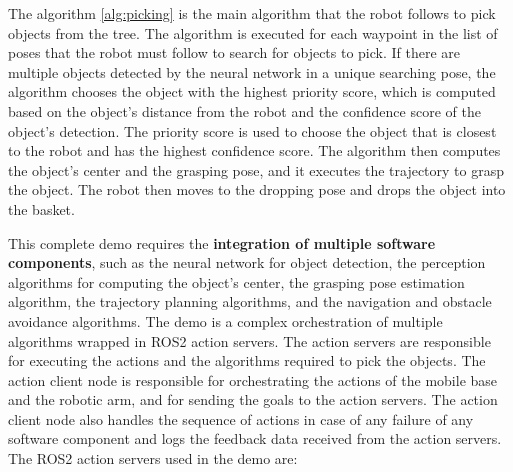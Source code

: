 The algorithm \ref{alg:picking} is the main algorithm that the robot follows to pick objects from the tree.
The algorithm is executed for each waypoint in the list of poses that the robot must follow to search
for objects to pick. If there are multiple objects detected by the neural network in a unique searching pose,
the algorithm chooses the object with the highest priority score, which is computed based on the object's distance
from the robot and the confidence score of the object's detection. The priority score is used to choose the object
that is closest to the robot and has the highest confidence score. The algorithm then computes the object's center
and the grasping pose, and it executes the trajectory to grasp the object. The robot then moves to the dropping pose
and drops the object into the basket. 

This complete demo requires the \textbf{integration of multiple software components},
such as the neural network for object detection,
the perception algorithms for computing the object's center, the grasping pose estimation algorithm, the trajectory
planning algorithms, and the navigation and obstacle avoidance algorithms. The demo is a complex orchestration of
multiple algorithms wrapped in ROS2 action servers. The action servers are responsible for executing the actions
and the algorithms required to pick the objects. The action client node is responsible for orchestrating the actions
of the mobile base and the robotic arm, and for sending the goals to the action servers. The action client node
also handles the sequence of actions in case of any failure of any software component and logs the feedback data
received from the action servers. The ROS2 action servers used in the demo are:

